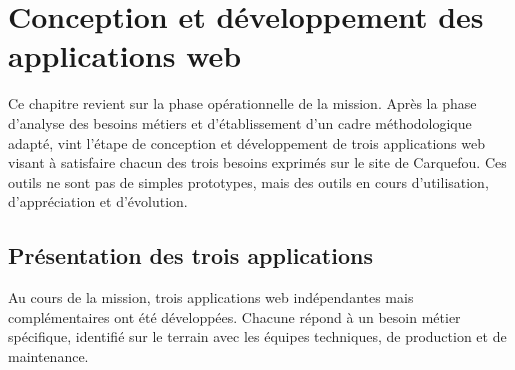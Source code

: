 \documentclass[11pt,a4paper]{article}
\begin{document}
\newpage
\section{Conception et développement des applications web}
Ce chapitre revient sur la phase opérationnelle de la mission. Après la phase d’analyse des besoins métiers et d’établissement d’un cadre méthodologique adapté, vint l’étape de conception et développement de trois applications web visant à satisfaire chacun des trois besoins exprimés sur le site de Carquefou. Ces outils ne sont pas de simples prototypes, mais des outils en cours d’utilisation, d’appréciation et d’évolution.


\subsection{Présentation des trois applications}
Au cours de la mission, trois applications web indépendantes mais complémentaires ont été développées. Chacune répond à un besoin métier spécifique, identifié sur le terrain avec les équipes techniques, de production et de maintenance. 
\end{document}
